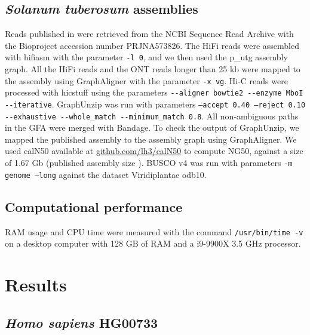\subsection{\textit{Solanum tuberosum} assemblies}

Reads published in \cite{potato} were retrieved from the NCBI Sequence Read Archive with the Bioproject accession number PRJNA573826. The HiFi reads were assembled with hifiasm with the parameter \texttt{-l 0}, and we then used the p\_utg assembly graph. All the HiFi reads and the ONT reads longer than 25 kb were mapped to the assembly using GraphAligner with the parameter \texttt{-x vg}. Hi-C reads were processed with hicstuff using the parameters \texttt{-{}-aligner bowtie2 -{}-enzyme MboI -{}-iterative}. GraphUnzip was run with parameters \texttt{--accept 0.40 --reject 0.10 -{}-exhaustive -{}-whole\_match -{}-minimum\_match 0.8}. All non-ambiguous paths in the GFA were merged with Bandage. To check the output of GraphUnzip, we mapped the published assembly to the assembly graph using GraphAligner. We used calN50 available at \href{https://github.com/lh3/calN50}{github.com/lh3/calN50} to compute NG50, against a size of 1.67 Gb (published assembly size \cite{potato}). BUSCO v4 \cite{busco_evaluation} was run with parameters \texttt{-m genome --long} against the dataset Viridiplantae odb10. 

\subsection{Computational performance}

RAM usage and CPU time were measured with the command \texttt{/usr/bin/time -v} on a desktop computer with 128 GB of RAM and a i9-9900X 3.5 GHz processor.

\section{Results}

\subsection{\textit{Homo sapiens} HG00733}

